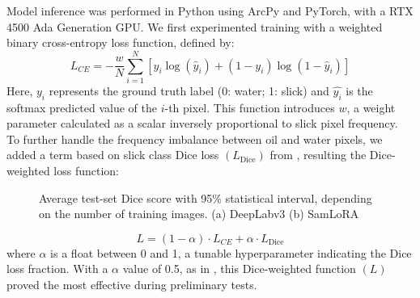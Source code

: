 \documentclass[journal]{IEEEtran}
\begin{document}
Model inference was performed in Python using ArcPy and PyTorch, with a RTX 4500 Ada Generation GPU.
We first experimented training with a weighted binary cross-entropy loss function, defined by:
\begin{equation}
    L_\textit{CE} = -\frac{w}{N} \sum_{i=1}^{N} \left[ y_i \log(\hat{y}_i) + (1 - y_i) \log(1 - \hat{y}_i) \right]
\end{equation}
Here, \( y_i \) represents the ground truth label (0: water; 1: slick) and \( \hat{y_i}  \) is the softmax predicted value of the \( i \)-th pixel. This function introduces \( w \), a weight parameter 
calculated as a scalar inversely proportional to slick pixel frequency\cite{azadLossFunctionsEra2023}. To further handle the frequency imbalance between oil and water pixels, 
we added a term based on slick class Dice loss \( (L_\text{Dice}) \) from \cite{milletariVNetFullyConvolutional2016}, resulting the Dice-weighted loss function:
\begin{figure}[!t]
    \centering
    \hfil
    \caption{Average test-set Dice score with 95\% statistical interval, depending on the number of training images. \quad (a) DeepLabv3 \quad (b) SamLoRA }
    \label{figure2}
\end{figure}
\begin{equation}
    L = (1 - \alpha) \cdot L_\textit{CE} + \alpha \cdot L_\text{Dice}
\end{equation}
where $\alpha$ is a float between 0 and 1, a tunable hyperparameter indicating the Dice loss fraction. With a $\alpha$ value of 0.5, as in \cite{taghanakiComboLossHandling2019}, 
this Dice-weighted function \( (L) \) proved the most effective during preliminary tests.
\end{document}

